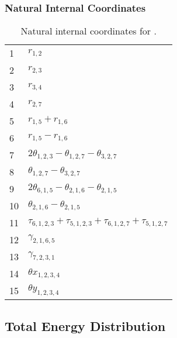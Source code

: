 \documentclass[10pt,oneside]{article}
\begin{document}
\begin{table}[h!]
\subsubsection*{Natural Internal Coordinates}
\centering
\caption{Natural internal coordinates for .}
\small
\begin{tabular}{ll}
\toprule
  1   & $r_{1,2}$ \\
  2   & $r_{2,3}$ \\
  3   & $r_{3,4}$ \\
  4   & $r_{2,7}$ \\
  5   & $r_{1,5} + r_{1,6}$ \\
  6   & $r_{1,5} - r_{1,6}$ \\
  7   & $2\theta_{1,2,3} - \theta_{1,2,7} - \theta_{3,2,7}$ \\
  8   & $\theta_{1,2,7} - \theta_{3,2,7}$ \\
  9   & $2\theta_{6,1,5} - \theta_{2,1,6} - \theta_{2,1,5}$ \\
  10  & $\theta_{2,1,6} - \theta_{2,1,5}$ \\
  11  & $\tau_{6,1,2,3} + \tau_{5,1,2,3} + \tau_{6,1,2,7} + \tau_{5,1,2,7}$ \\
  12  & $\gamma_{2,1,6,5}$ \\
  13  & $\gamma_{7,2,3,1}$ \\
  14  & $\theta x_{1,2,3,4}$ \\
  15  & $\theta y_{1,2,3,4}$ \\
\bottomrule
\end{tabular}
\end{table}

\begin{table}
\subsection*{Total Energy Distribution}
\centering\end{table}

\clearpage

\subsection{}
\end{document}
